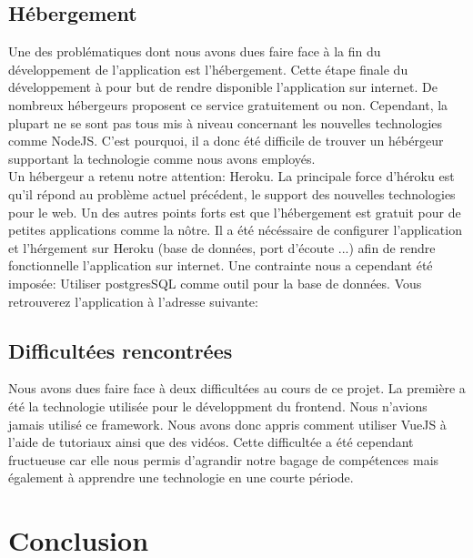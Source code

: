 \documentclass[a4paper,11pt, oneside]{book}
\begin{document}
\section{Hébergement}

Une des problématiques dont nous avons dues faire face à la fin du développement de l'application est l'hébergement. Cette étape finale du développement à pour but de
rendre disponible l'application sur internet. De nombreux hébergeurs proposent ce service gratuitement ou non. Cependant, la plupart ne se sont pas tous mis à niveau concernant
les nouvelles technologies comme NodeJS. C'est pourquoi, il a donc été difficile de trouver un hébérgeur supportant la technologie comme nous avons employés.\\

Un hébergeur a retenu notre attention: Heroku. La principale force d'héroku est qu'il répond au problème actuel précédent, le support des nouvelles technologies pour le web.
Un des autres points forts est que l'hébergement est gratuit pour de petites applications comme la nôtre. Il a été nécéssaire de configurer l'application et l'hérgement sur Heroku (base de données, port d'écoute ...)
afin de rendre fonctionnelle l'application sur internet. Une contrainte nous a cependant été imposée: Utiliser postgresSQL comme outil pour la base de données. Vous retrouverez l'application à l'adresse suivante:

\section{Difficultées rencontrées}

Nous avons dues faire face à deux difficultées au cours de ce projet. La première a été la technologie utilisée pour le développment du frontend. Nous n'avions jamais utilisé ce framework.
Nous avons donc appris comment utiliser VueJS à l'aide de tutoriaux ainsi que des vidéos. Cette difficultée a été cependant fructueuse car elle nous permis d'agrandir notre bagage de compétences
mais également à apprendre une technologie en une courte période.

\chapter{Conclusion}
\end{document}
